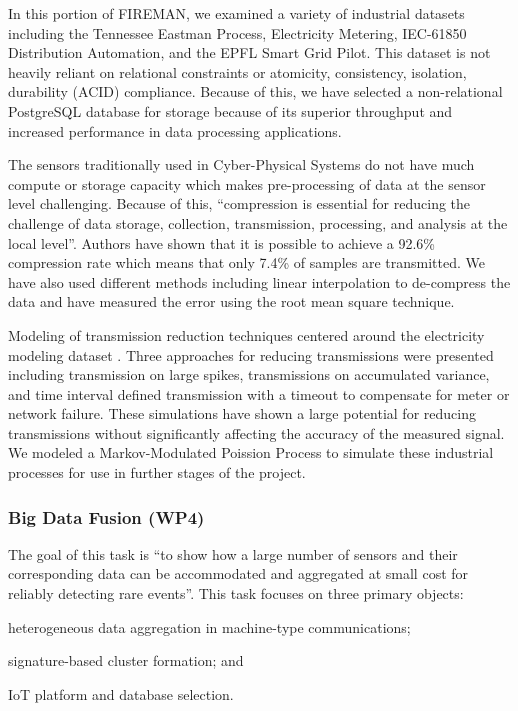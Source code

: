 In this portion of FIREMAN, we examined a  variety of industrial datasets including the Tennessee Eastman Process, Electricity Metering, IEC-61850 Distribution Automation, and the EPFL Smart Grid Pilot. This dataset is not heavily reliant on relational constraints or atomicity, consistency, isolation, durability (ACID) compliance. Because of this, we have selected a non-relational PostgreSQL database for storage because of its superior throughput and increased performance in data processing applications.

The sensors traditionally used in Cyber-Physical Systems do not have much compute or storage capacity which makes pre-processing of data at the sensor level challenging. Because of this, \enquote{compression is essential for reducing the challenge of data storage, collection, transmission, processing, and analysis at the local level}\parencite{compression}. Authors \cite{wp3.2} have shown that it is possible to achieve a 92.6\% compression rate which means that only 7.4\% of samples are transmitted. We have also used different methods including linear interpolation to de-compress the data and have measured the error using the root mean square technique. 


Modeling of transmission reduction techniques centered around the electricity modeling dataset \parencite{elect-model-dataset-9694611}. Three approaches for reducing transmissions were presented including transmission on large spikes, transmissions on accumulated variance, and time interval defined transmission with a timeout to compensate for meter or network failure. These simulations have shown a large potential for reducing transmissions without significantly affecting the accuracy of the measured signal. We modeled a Markov-Modulated Poission Process to simulate these industrial processes for use in further stages of the project.

\subsubsection{Big Data Fusion (WP4)}
\label{ref_wp4}
The goal of this task is \enquote{to show how a large number of sensors and their corresponding data can be  accommodated and aggregated at small cost for reliably detecting rare events}\parencite{wp4.1}. This task focuses on three primary objects: 
\begin{inlinelist}
    \item heterogeneous data aggregation in machine-type communications;
    \item signature-based cluster formation; and
    \item IoT platform and database selection.
\end{inlinelist}

